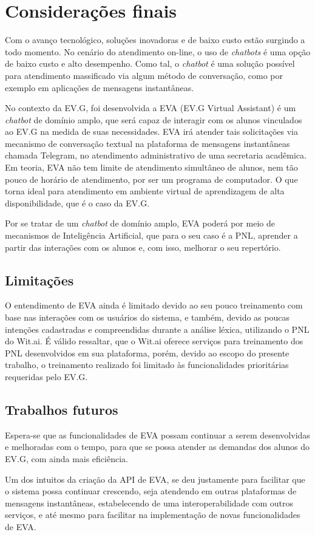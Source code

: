 \chapter{Considerações finais}

Com o avanço tecnológico, soluções inovadoras e de baixo custo estão surgindo a todo momento. No cenário do atendimento on-line, o uso de \textit{chatbots} é uma opção de baixo custo e alto desempenho. Como tal, o \textit{chatbot} é uma solução possível para atendimento massificado via algum método de conversação, como por exemplo em aplicações de mensagens instantâneas.

No contexto da EV.G, foi desenvolvida a EVA (EV.G Virtual Assistant) é um \textit{chatbot} de domínio amplo, que será capaz de interagir com os alunos vinculados ao EV.G na medida de suas necessidades. EVA irá atender tais solicitações via mecanismo de conversação textual na plataforma de mensagens instantâneas chamada Telegram, no atendimento administrativo de uma secretaria acadêmica. Em teoria, EVA não tem limite de atendimento simultâneo de alunos, nem tão pouco de horário de atendimento, por ser um programa de computador. O que torna ideal para atendimento em ambiente virtual de aprendizagem de alta disponibilidade, que é o caso da EV.G.

Por se tratar de um \textit{chatbot} de domínio amplo, EVA poderá por meio de mecanismos de Inteligência Artificial, que para o seu caso é a PNL, aprender a partir das interações com os alunos e, com isso, melhorar o seu repertório.

\section{Limitações}

O entendimento de EVA ainda é limitado devido ao seu pouco treinamento com base nas interações com os usuários do sistema, e também, devido as poucas intenções cadastradas e compreendidas durante a análise léxica, utilizando o PNL do Wit.ai. É válido ressaltar, que o Wit.ai oferece serviços para treinamento dos PNL desenvolvidos em sua plataforma, porém, devido ao escopo do presente trabalho, o treinamento realizado foi limitado às funcionalidades prioritárias requeridas pelo EV.G.

\section{Trabalhos futuros}

Espera-se que as funcionalidades de EVA possam continuar a serem desenvolvidas e melhoradas com o tempo, para que se possa atender as demandas dos alunos do EV.G, com ainda mais eficiência.

Um dos intuitos da criação da API de EVA, se deu justamente para facilitar que o sistema possa continuar crescendo, seja atendendo em outras plataformas de mensagens instantâneas, estabelecendo de uma interoperabilidade com outros serviços, e até mesmo para facilitar na implementação de novas funcionalidades de EVA. 